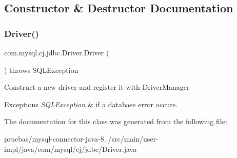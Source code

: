 \subsection{Constructor \& Destructor Documentation}
\mbox{\label{classcom_1_1mysql_1_1cj_1_1jdbc_1_1_driver_aa4ef6be75ad3caf8eb7ebd1cfe77ddfe}} 
\subsubsection{\texorpdfstring{Driver()}{Driver()}}
{\footnotesize\ttfamily com.\+mysql.\+cj.\+jdbc.\+Driver.\+Driver (\begin{DoxyParamCaption}{ }\end{DoxyParamCaption}) throws S\+Q\+L\+Exception}

Construct a new driver and register it with Driver\+Manager


\begin{DoxyExceptions}{Exceptions}
{\em S\+Q\+L\+Exception} & if a database error occurs. \\
\hline
\end{DoxyExceptions}


The documentation for this class was generated from the following file\+:\begin{DoxyCompactItemize}
\item 
pruebas/mysql-\/connector-\/java-\/8../src/main/user-\/impl/java/com/mysql/cj/jdbc/Driver.\+java\end{DoxyCompactItemize}
